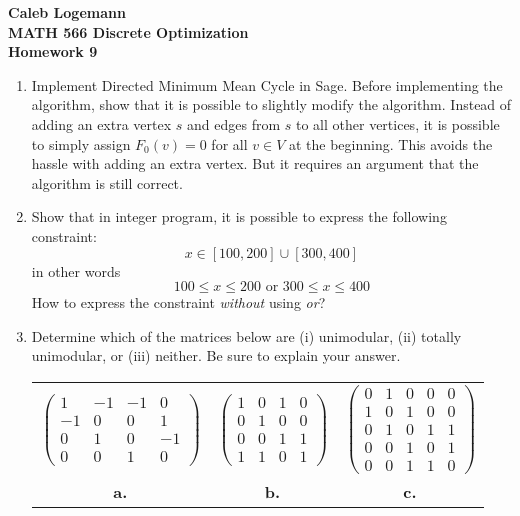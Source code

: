 \documentclass[11pt, oneside]{article}
\begin{document}
\noindent \textbf{\Large{Caleb Logemann \\
MATH 566 Discrete Optimization\\
Homework 9
}}

%
\begin{enumerate}
  \item %
    Implement Directed Minimum Mean Cycle in Sage. 
    Before implementing the algorithm, show that it is possible to slightly
    modify the algorithm.
    Instead of adding an extra vertex $s$ and edges from $s$ to all other
    vertices, it is possible to simply assign $F_0(v) = 0$ for all $v \in V$ at
    the beginning.
    This avoids the hassle with adding an extra vertex.
    But it requires an argument that the algorithm is still correct.

    
    

  \item %
    Show that in integer program, it is possible to express the following constraint:
    \[
      x \in [100,200]  \cup [300,400]
    \]
    in other words
    \[
      100 \leq x \leq 200   \text{ or } 300 \leq x \leq 400
    \]
    How to express the constraint \emph{without} using \emph{or}?\\

  \item %
    Determine which of the matrices below are (i) unimodular, (ii) totally
    unimodular, or (iii) neither.
    Be sure to explain your answer.

    \begin{center}
      \begin{tabular}[h]{c@{\qquad}c@{\qquad}c}
        $\left(\begin{array}{rrrr}
        1 & -1 & -1 & 0\\
        -1 & 0 & 0 & 1\\
        0 & 1 & 0 & -1\\
        0 & 0 & 1 & 0\end{array}\right)$ & 
        $\left(\begin{array}{cccc}
        1 & 0 & 1 & 0\\
        0 & 1 & 0 & 0\\
        0 & 0 & 1 & 1\\
        1 & 1 & 0 & 1\end{array}\right)$ &
        $\left(\begin{array}{ccccc}
        0 & 1 & 0 & 0 & 0  \\
        1 & 0 & 1 & 0  & 0 \\
        0 & 1 & 0 & 1 & 1\\
        0 & 0 & 1 & 0 & 1\\
        0 & 0 & 1 & 1 & 0\end{array}\right) $
        \\
        \textbf{a.} &
        \textbf{b.}  &
        \textbf{c.} 
      \end{tabular}
    \end{center}


\end{enumerate}
\end{document}
